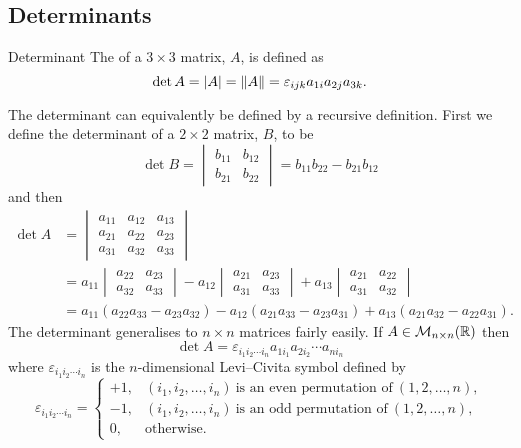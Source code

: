 \subsection{Determinants}
\begin{definition}{Determinant}{}
    The  of a \(3\times 3\) matrix, \(A\), is defined as
    \[\det A = \abs{A} = \norm{A} = \varepsilon_{ijk}a_{1i}a_{2j}a_{3k}.\]
\end{definition}
The determinant can equivalently be defined by a recursive definition.
First we define the determinant of a \(2\times 2\) matrix, \(B\), to be
\[
\det B =
\begin{vmatrix}
    b_{11} & b_{12}\\
    b_{21} & b_{22}
\end{vmatrix}
= b_{11}b_{22} - b_{21}b_{12}
\]
and then
\begin{align*}
    \det A &= \begin{vmatrix}
        a_{11} & a_{12} & a_{13}\\
        a_{21} & a_{22} & a_{23}\\
        a_{31} & a_{32} & a_{33}
    \end{vmatrix}
    \\
    &= a_{11}
    \begin{vmatrix}
        a_{22} & a_{23}\\
        a_{32} & a_{33}
    \end{vmatrix}
    - a_{12}
    \begin{vmatrix}
        a_{21} & a_{23}\\
        a_{31} & a_{33}
    \end{vmatrix}
    + a_{13}
    \begin{vmatrix}
        a_{21} & a_{22}\\
        a_{31} & a_{32}
    \end{vmatrix}
    \\
    &= 
    a_{11}(a_{22}a_{33} - a_{23}a_{32}) - a_{12}(a_{21}a_{33} - a_{23}a_{31}) + a_{13}(a_{21}a_{32} - a_{22}a_{31}).
\end{align*}
The determinant generalises to \(n\times n\) matrices fairly easily.
If \(A\in\mathcal{M}_{{n}\times{n}}({\mathbb{R}})\) then
\[\det A = \varepsilon_{i_1i_2\dotsm i_n} a_{1i_1}a_{2i_2}\dotsm a_{ni_n}\]
where \(\varepsilon_{i_1i_2\dotsm i_n}\) is the \(n\)-dimensional Levi--Civita symbol defined by
\[
\varepsilon_{i_1i_2\dotsm i_n} =
\begin{cases}
    +1, & (i_1, i_2, \dotsc, i_n)~\text{is an even permutation of}~(1, 2, \dotsc, n),\\
    -1, & (i_1, i_2, \dotsc, i_n)~\text{is an odd permutation of}~(1, 2, \dotsc, n),\\
    0, & \text{otherwise}.
\end{cases}
\]
